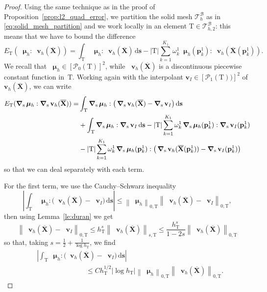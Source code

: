 \documentclass[oneside]{amsart} %
\newcommand{\norm}[1]{\left\lVert#1\right\rVert}
\newcommand{\abs}[1]{\left\lvert#1\right\rvert}
\DeclareMathOperator{\grads}{\boldsymbol\nabla_s}
\newcommand\B{\mathcal B} %
\renewcommand\v{\mathbf{v}} %
\newcommand\s{\mathbf{s}} %
\newcommand\X{\mathbf{X}} %
\newcommand\Xbar{\overline{\X}} %
\newcommand\mmu{{\boldsymbol\mu}} %
\newcommand\ds{\mathrm{d}\s} %
\newcommand\T{\mathcal{T}} %
\newcommand\quadnode{\mathbf{p}}
\newcommand\quadweigth{\omega}
\newcommand\Pcal{\mathcal{P}}
\newcommand\tri{\mathrm{T}} %
\newcommand\DB{\begin{color}{black}}
\newcommand\BD{\end{color}}
\begin{document}
	\begin{proof}
		Using the same technique as in the proof of Proposition~\ref{prop:l2_quad_error},
		we partition the solid mesh $\T_h^\B$ as in
		\eqref{eq:solid_mesh_partition} and we work locally in an element
		$\tri\in\T_{h,2}^\B$: this means that we have to bound the difference
		\begin{equation}
			E_\tri(\grads\mmu_h:\grads\v_h(\Xbar)) = \int_\tri
			\grads\mmu_h:\grads\v_h(\Xbar)\,\ds -
			\abs{\tri}\sum_{k=1}^{K_1}\quadweigth_k^1\grads\mmu_h(\quadnode_k^1):
			\grads\v_h(\Xbar(\quadnode_k^1)).
		\end{equation}
		We recall that $\grads\mmu_h\in[\Pcal_0(\tri)]^2$, while $\grads\v_h(\Xbar)$ is
		a discontinuous piecewise constant function in~$\tri$.
		Working again with the interpolant $\v_I\in[\Pcal_1(\tri))]^2$ of $\v_h(\Xbar)$,
		we can write
		\begin{equation}\label{eq:manipulation_h1}
			\begin{aligned}
				E_\tri(\grads\mmu_h:\grads\v_h(\Xbar)) = &\int_\tri \grads\mmu_h:\big(\grads\v_h(\Xbar)-\grads\v_I\big)\,\ds\\
				&+ \int_\tri \grads\mmu_h:\grads\v_I\,\ds - \abs{\tri}\sum_{k=1}^{K_1}\quadweigth_k^1\grads\mmu_h(\quadnode_k^1):\grads\v_I(\quadnode_k^1)\\
				&\DB-\BD  \abs{\tri} \sum_{k=1}^{K_1}\quadweigth_k^1 \grads\mmu_h(\quadnode_k^1): \big(\grads\v_h(\Xbar(\quadnode_k^1))-\grads\v_I(\quadnode_k^1)\big)
			\end{aligned}
		\end{equation}
		so that we can deal separately with each term.
		
		For the first term, we use the Cauchy--Schwarz inequality
		\begin{equation}
			\abs{\int_\tri
				\grads\mmu_h:\big(\grads\v_h(\Xbar)-\grads\v_I\big)\,\ds}\le
			\norm{\grads\mmu_h}_{0,\tri} \norm{\grads\v_h(\Xbar)-\grads\v_I}_{0,\tri},
		\end{equation}
		then using Lemma~\ref{le:duran} we get
		\[
		\norm{\grads\v_h(\Xbar)-\grads\v_I}_{0,\tri}
		\le h_\tri^s\norm{\grads\v_h(\Xbar)}_{s,\tri}
		\le \frac{h_\tri^s}{1-2s}\norm{\grads\v_h(\Xbar)}_{0,\tri}
		\]
		so that, taking $s=\frac12+\frac1{\log h_\tri}$, we find
		\begin{equation}
			\begin{aligned}
				&\abs{\int_\tri \grads\mmu_h:\big(\grads\v_h(\Xbar)-\grads\v_I\big)\,\ds}\\
				&\hspace{3cm}\le Ch_\tri^{1/2}\abs{\log h_\tri} \norm{\grads\mmu_h}_{0,\tri}\norm{\grads\v_h(\Xbar)}_{0,\tri}.
			\end{aligned}
		\end{equation}
		

\end{proof}
\end{document}
